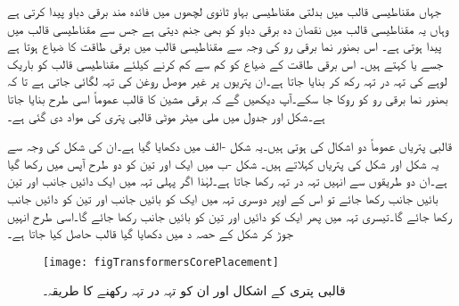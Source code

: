 جہاں مقناطیسی قالب میں بدلتی مقناطیسی بہاو ثانوی لچھوں میں فائدہ مند برقی دباو پیدا کرتی ہے وہاں یہ مقناطیسی قالب میں نقصان دہ برقی دباو کو بھی جنم دیتی ہے جس سے مقناطیسی قالب میں  پیدا ہوتی ہے۔ اس بھنور نما برقی رو کی وجہ سے مقناطیسی قالب میں برقی طاقت کا ضیاع ہوتا ہے جسے   یا  کہتے ہیں۔ اس برقی طاقت  کے ضیاع کو کم سے کم کرنے کیلئے مقناطیسی قالب کو  باریک لوہے کی  تہہ در تہہ رکھ کر بنایا جاتا ہے۔ان پتریوں پر غیر موصل روغن کی تہہ لگائی جاتی ہے تا کہ بھنور نما برقی رو کو روکا جا سکے۔آپ دیکھیں گے کہ برقی مشین کا قالب عموماً اسی طرح بنایا جاتا ہے۔شکل  اور جدول   میں  ملی میٹر موٹی  قالبی پتری کی  مواد دی گئی ہے۔

قالبی پتریاں عموماً دو اشکال کی ہوتی ہیں۔یہ شکل -الف میں دکھایا گیا ہے۔ان کی شکل کی وجہ سے یہ  شکل اور  شکل کی پتریاں کہلاتے ہیں۔ شکل -ب میں ایک اور تین  کو دو طرح آپس میں رکھا گیا ہے۔ان دو طریقوں سے انہیں تہہ در تہہ رکھا جاتا ہے۔لہٰذا اگر پہلی تہہ میں ایک دائیں جانب اور تین بائیں جانب رکھا جائے تو اس کے اوپر دوسری تہہ میں ایک کو بائیں جانب اور تین کو دائیں جانب رکھا جائے گا۔تیسری تہہ میں پھر ایک کو دائیں اور تین کو بائیں جانب رکھا جائے گا۔اسی طرح انہیں جوڑ کر شکل کے حصہ د میں دکھایا گیا قالب حاصل کیا جاتا ہے۔

\begin{figure}
\centering
\texttt{[image: figTransformersCorePlacement]}
\caption{قالبی پتری کے اشکال اور ان کو تہہ در تہہ رکھنے کا طریقہ۔}
\label{شکل_ٹرانسفارم_تہہ_در_تہہ_مرکز}
\end{figure}

